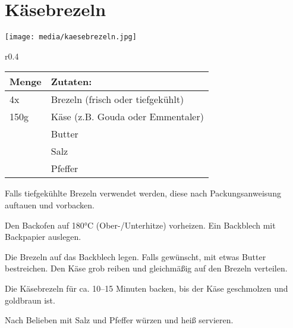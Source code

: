 \documentclass[../../book.tex]{subfiles}
\begin{document}
\section{Käsebrezeln}

\begin{figure*}[h]
  \centering
  \texttt{[image: media/kaesebrezeln.jpg]}
\end{figure*}

\begin{wraptable}{r}{0.4\textwidth}
  \centering
  \begin{tabularx}{0.39\textwidth}{|l|X|}
    \toprule
    Menge & Zutaten: \\
    \midrule
    4x & Brezeln (frisch oder tiefgekühlt) \\
    \midrule
    150g & Käse (z.B. Gouda oder Emmentaler) \\
    \midrule
    & Butter \\
    \midrule
    & Salz \\
    \midrule
    & Pfeffer \\
    \bottomrule
  \end{tabularx}
\end{wraptable}

Falls tiefgekühlte Brezeln verwendet werden, diese nach Packungsanweisung auftauen und vorbacken.

Den Backofen auf 180°C (Ober-/Unterhitze) vorheizen. Ein Backblech mit Backpapier auslegen.

Die Brezeln auf das Backblech legen. Falls gewünscht, mit etwas Butter bestreichen. Den Käse grob reiben und gleichmäßig auf den Brezeln verteilen.

Die Käsebrezeln für ca. 10–15 Minuten backen, bis der Käse geschmolzen und goldbraun ist.

Nach Belieben mit Salz und Pfeffer würzen und heiß servieren.

\newpage
\end{document}
